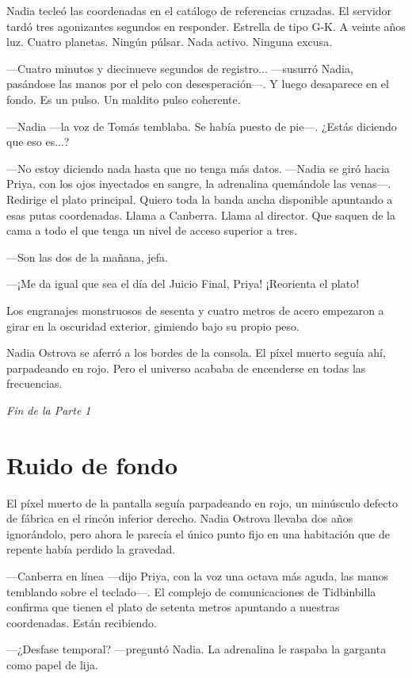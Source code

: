 \documentclass[11pt,a5paper,twoside]{book}
\begin{document}
Nadia tecleó las coordenadas en el catálogo de referencias cruzadas. El servidor tardó tres agonizantes segundos en responder.
Estrella de tipo G-K. A veinte años luz. Cuatro planetas. Ningún púlsar. Nada activo. Ninguna excusa.

—Cuatro minutos y diecinueve segundos de registro... —susurró Nadia, pasándose las manos por el pelo con desesperación—. Y luego desaparece en el fondo. Es un pulso. Un maldito pulso coherente.

—Nadia —la voz de Tomás temblaba. Se había puesto de pie—. ¿Estás diciendo que eso es...?

—No estoy diciendo nada hasta que no tenga más datos. —Nadia se giró hacia Priya, con los ojos inyectados en sangre, la adrenalina quemándole las venas—. Redirige el plato principal. Quiero toda la banda ancha disponible apuntando a esas putas coordenadas. Llama a Canberra. Llama al director. Que saquen de la cama a todo el que tenga un nivel de acceso superior a tres.

—Son las dos de la mañana, jefa.

—¡Me da igual que sea el día del Juicio Final, Priya! ¡Reorienta el plato!

Los engranajes monstruosos de sesenta y cuatro metros de acero empezaron a girar en la oscuridad exterior, gimiendo bajo su propio peso.

Nadia Ostrova se aferró a los bordes de la consola. El píxel muerto seguía ahí, parpadeando en rojo. Pero el universo acababa de encenderse en todas las frecuencias.

\textit{Fin de la Parte 1}

\chapter{Ruido de fondo}

El píxel muerto de la pantalla seguía parpadeando en rojo, un minúsculo defecto de fábrica en el rincón inferior derecho. Nadia Ostrova llevaba dos años ignorándolo, pero ahora le parecía el único punto fijo en una habitación que de repente había perdido la gravedad.

—Canberra en línea —dijo Priya, con la voz una octava más aguda, las manos temblando sobre el teclado—. El complejo de comunicaciones de Tidbinbilla confirma que tienen el plato de setenta metros apuntando a nuestras coordenadas. Están recibiendo.

—¿Desfase temporal? —preguntó Nadia. La adrenalina le raspaba la garganta como papel de lija.
\end{document}
